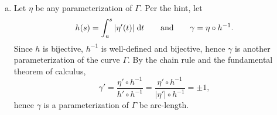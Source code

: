 \begin{exrc}[1]
\begin{soln}
\begin{enumerate}[(a)]
    \item
        Let \(\eta\) be any parameterization of \(\Gamma\).
        Per the hint, let
        \begin{equation*}
            h(s) = \int_{a}^{s} |\eta'(t)| \;\mathrm d t
            \quad \quad \text{and} \quad \quad
            \gamma = \eta \circ h^{-1}.
        \end{equation*}
        Since \(h\) is bijective, \(h^{-1}\) is well-defined and bijective,
        hence \(\gamma\) is another parameterization of the curve \(\Gamma\).
        By the chain rule and the fundamental theorem of calculus,
        \begin{equation*}
            \gamma' = \frac{\eta' \circ h^{-1}}{h' \circ h^{-1}}
            = \frac{\eta' \circ h^{-1}}{|\eta'| \circ h^{-1}}
            = \pm 1,
        \end{equation*}
        hence \(\gamma\) is a parameterization of \(\Gamma\) be arc-length.

    \end{enumerate}

\end{soln}
\end{exrc}
